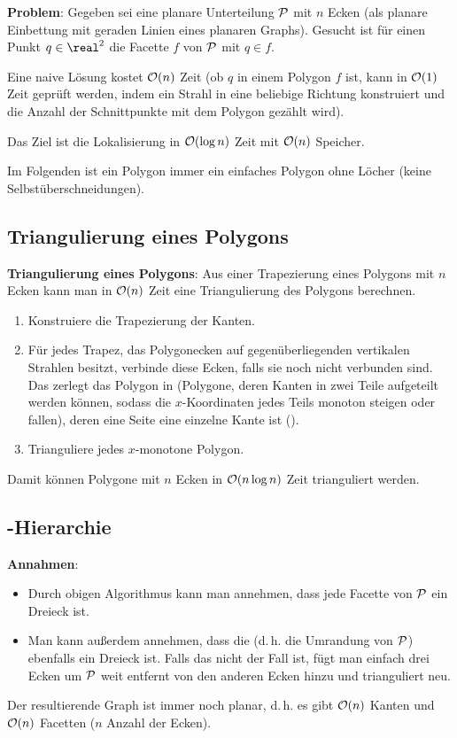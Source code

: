 \textbf{Problem}:
Gegeben sei eine planare Unterteilung $\P$ mit $n$ Ecken
(als planare Einbettung mit geraden Linien eines planaren Graphs).
Gesucht ist für einen Punkt $q \in \real^2$ die Facette $f$ von $\P$ mit $q \in f$.

Eine naive Lösung kostet $\O(n)$ Zeit
(ob $q$ in einem Polygon $f$ ist, kann in $\O(1)$ Zeit geprüft werden, indem ein
Strahl in eine beliebige Richtung konstruiert und die Anzahl der Schnittpunkte mit dem Polygon
gezählt wird).

Das Ziel ist die Lokalisierung in $\O(\log n)$ Zeit mit $\O(n)$ Speicher.

Im Folgenden ist ein Polygon immer ein einfaches Polygon ohne Löcher
(keine Selbstüberschneidungen).

\subsection{%
    Triangulierung eines Polygons%
}

\textbf{Triangulierung eines Polygons}:
Aus einer Trapezierung eines Polygons mit $n$ Ecken kann man in $\O(n)$ Zeit
eine Triangulierung des Polygons berechnen.
\begin{enumerate}
    \item
    Konstruiere die Trapezierung der Kanten.

    \item
    Für jedes Trapez, das Polygonecken auf gegenüberliegenden vertikalen Strahlen besitzt,
    verbinde diese Ecken, falls sie noch nicht verbunden sind.
    Das zerlegt das Polygon in 
    (Polygone, deren Kanten in zwei Teile aufgeteilt werden können,
    sodass die $x$-Koordinaten jedes Teils monoton steigen oder fallen),
    deren eine Seite eine einzelne Kante ist
    ().

    \item
    Trianguliere jedes $x$-monotone Polygon.
\end{enumerate}
Damit können Polygone mit $n$ Ecken in $\O(n \log n)$ Zeit trianguliert werden.

\pagebreak

\subsection{%
    -Hierarchie%
}

\textbf{Annahmen}:
\begin{itemize}
    \item
    Durch obigen Algorithmus kann man annehmen, dass jede Facette von $\P$ ein Dreieck ist.

    \item
    Man kann außerdem annehmen, dass die  (d.\,h. die Umrandung von $\P$)
    ebenfalls ein Dreieck ist.
    Falls das nicht der Fall ist, fügt man einfach drei Ecken um $\P$ weit entfernt von den
    anderen Ecken hinzu und trianguliert neu.
\end{itemize}
Der resultierende Graph ist immer noch planar, d.\,h. es gibt $\O(n)$ Kanten und $\O(n)$ Facetten
($n$ Anzahl der Ecken).


